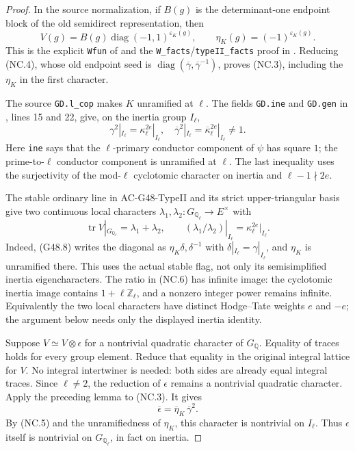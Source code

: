 \begin{proof}
In the source normalization, if $B(g)$ is the determinant-one
endpoint block of the old semidirect representation, then
\[
  V(g)=B(g)\operatorname{diag}(-1,1)^{\varepsilon_K(g)},
       \qquad \eta_K(g)=(-1)^{\varepsilon_K(g)}.           \tag{NC.4}
\]
This is the explicit \texttt{Wfun} of
and the \texttt{W\_facts}/\texttt{typeII\_facts} proof in
.
Reducing (NC.4), whose old endpoint seed is
$\operatorname{diag}(\overline\gamma,
\overline\gamma^{-1})$, proves (NC.3), including the
$\eta_K$ in the first character.

The source \texttt{GD.l\_cop} makes $K$ unramified at
$\ell$.  The fields \texttt{GD.ine} and \texttt{GD.gen}
in , lines 15 and 22,
give, on the inertia group $I_\ell$,
\[
  \gamma^2|_{I_\ell}=\kappa_\ell^{2e}|_{I_\ell},
  \quad
  \overline\gamma^2|_{I_\ell}
       =\overline\kappa_\ell^{2e}|_{I_\ell}\ne1.          \tag{NC.5}
\]
Here \texttt{ine} says that the $\ell$-primary conductor
component of $\psi$ has square $1$; the prime-to-$\ell$
conductor component is unramified at $\ell$.  The last
inequality uses the surjectivity of the mod-$\ell$
cyclotomic character on inertia and $\ell-1\nmid2e$.

The stable ordinary line in AC-G48-TypeII and its strict
upper-triangular basis give two continuous local characters
$\lambda_1,\lambda_2:G_{\mathbb Q_\ell}\to E^\times$
with
\[
 \operatorname{tr}V|_{G_{\mathbb Q_\ell}}
       =\lambda_1+\lambda_2,
 \qquad
 (\lambda_1/\lambda_2)|_{I_\ell}
                          =\kappa_\ell^{2e}|_{I_\ell}.    \tag{NC.6}
\]
Indeed, (G48.8) writes the diagonal as
$\eta_K\delta,\delta^{-1}$ with
$\delta|_{I_\ell}=\gamma|_{I_\ell}$, and $\eta_K$ is
unramified there.  This uses the actual stable flag, not
only its semisimplified inertia eigencharacters.  The
ratio in (NC.6) has infinite image: the cyclotomic inertia
image contains $1+\ell\mathbb Z_\ell$, and a nonzero
integer power remains infinite.  Equivalently the two
local characters have distinct Hodge--Tate weights
$e$ and $-e$; the argument below needs only the displayed
inertia identity.

Suppose $V\simeq V\otimes\epsilon$ for a nontrivial
quadratic character of $G_{\mathbb Q}$.  Equality of traces
holds for every group element.  Reduce that equality in
the original integral lattice for $V$.  No integral
intertwiner is needed: both sides are already equal
integral traces.  Since $\ell\ne2$, the reduction of
$\epsilon$ remains a nontrivial quadratic character.
Apply the preceding lemma to (NC.3).  It gives
\[
           \overline\epsilon
              =\overline\eta_K\,\overline\gamma^2.      \tag{NC.7}
\]
By (NC.5) and the unramifiedness of $\eta_K$, this character
is nontrivial on $I_\ell$.  Thus $\epsilon$ itself is
nontrivial on $G_{\mathbb Q_\ell}$, in fact on inertia.


\end{proof}
